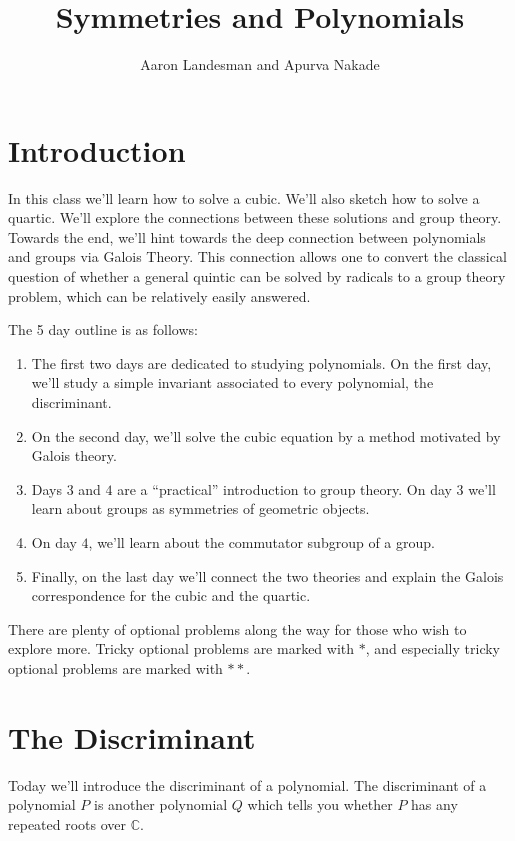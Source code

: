 \documentclass[reqno, 12pt, letter]{article}
\title{Symmetries and Polynomials}
\author{Aaron Landesman and Apurva Nakade}
\theoremstyle{plain}
\theoremstyle{definition}
\theoremstyle{remark}
\numberwithin{equation}{section}
\newcommand\bc{{\mathbb C}}
\begin{document}
\maketitle


\section*{Introduction}
In this class we'll learn how to solve a cubic. We'll also sketch how to solve a quartic. We'll explore the connections between these solutions and group theory.
Towards the end, we'll hint towards the deep connection between polynomials and groups via Galois Theory. This connection allows one to convert the classical question of whether a general quintic can be solved by radicals to a group theory problem, which can be relatively easily answered. 

The 5 day outline is as follows: 
\begin{enumerate}
	\item The first two days are dedicated to studying polynomials. On the first day, we'll study a simple invariant associated to every polynomial, the discriminant.
	\item On the second day, we'll solve the cubic equation by a method motivated by Galois theory.
	\item Days $3$ and $4$ are a ``practical'' introduction to group theory. On day $3$ we'll learn about groups as symmetries of geometric objects.
	\item On day $4$, we'll learn about the commutator subgroup of a group.
	\item Finally, on the last day we'll connect the two theories and explain the Galois correspondence for the cubic and the quartic. 
\end{enumerate}
There are plenty of optional problems along the way for those who wish to explore more.
Tricky optional problems are marked with $*$, and especially tricky optional problems are marked with $**$.

\newpage
\section{The Discriminant}
Today we'll introduce the discriminant of a polynomial. The discriminant of a polynomial $P$ is another polynomial $Q$ which tells you
whether $P$ has any repeated roots over $\bc$.
\end{document}
